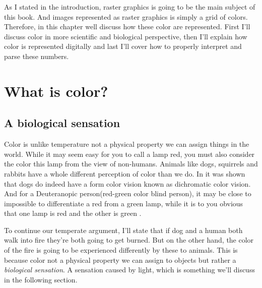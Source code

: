 



As I stated in the introduction, raster graphics is going to be the
main subject of this book. And images represented as raster graphics
is simply a grid of colors. Therefore, in this chapter well discuss
how these color are represented. First I'll discuss color in more
scientific and biological perspective, then I'll explain how color is
represented digitally and last I'll cover how to properly interpret
and parse these numbers.

\section{What is color?}

\subsection{A biological sensation}

\newcommand{\bluewave}{\ensuremath{\SI{400}{\nano\meter}}}

Color is unlike temperature not a physical property we can assign
things in the world. While it may seem easy for you to call a lamp
red, you must also consider the color this lamp from the view of
non-humans. Animals like dogs, squirrels and rabbits have a whole
different perception of color than we do. In \cite{dog_color_vision}
it was shown that dogs do indeed have a form color vision known as
dichromatic color vision. And for a Deuteranopic person(red-green
color blind person), it may be close to impossible to differentiate a
red from a green lamp, while it is to you obvious that one lamp is red
and the other is green
\cite{thompson:ways_of_coloring,schanda97:_colorimetry}.

To continue our temperate argument, I'll state that if dog and a human
both walk into fire they're both going to get burned. But on the other
hand, the color of the fire is going to be experienced differently by
these to animals. This is because color not a physical property we can
assign to objects but rather a \textit{biological
  sensation}\cite{boutel:_png_portab_networ_graph_specif_version12}. A
sensation caused by light, which is something we'll discuss in the
following section.

